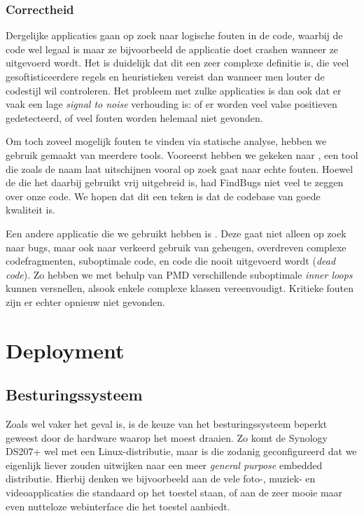 \subsection{Correctheid}
\label{server:realisatie:codeanalyse:correctheid}

Dergelijke applicaties gaan op zoek naar logische fouten in de code, waarbij de code wel legaal is maar ze bijvoorbeeld de applicatie doet crashen wanneer ze uitgevoerd wordt. Het is duidelijk dat dit een zeer complexe definitie is, die veel gesoftisticeerdere regels en heuristieken vereist dan wanneer men louter de codestijl wil controleren. Het probleem met zulke applicaties is dan ook dat er vaak een lage \emph{signal to noise} verhouding is: of er worden veel valse positieven gedetecteerd, of veel fouten worden helemaal niet gevonden.

Om toch zoveel mogelijk fouten te vinden via statische analyse, hebben we gebruik gemaakt van meerdere tools. Vooreerst hebben we gekeken naar , een tool die zoals de naam laat uitschijnen vooral op zoek gaat naar echte fouten. Hoewel de  die het daarbij gebruikt vrij uitgebreid is, had FindBugs niet veel te zeggen over onze code. We hopen dat dit een teken is dat de codebase van goede kwaliteit is.

Een andere applicatie die we gebruikt hebben is . Deze gaat niet alleen op zoek naar bugs, maar ook naar verkeerd gebruik van geheugen, overdreven complexe codefragmenten, suboptimale code, en code die nooit uitgevoerd wordt (\emph{dead code}). Zo hebben we met behulp van PMD verschillende suboptimale \emph{inner loops} kunnen versnellen, alsook enkele complexe klassen vereenvoudigt. Kritieke fouten zijn er echter opnieuw niet gevonden.

\chapter{Deployment}
\label{server:deployment}

\section{Besturingssysteem}
\label{server:deployment:besturingssysteem}

Zoals wel vaker het geval is, is de keuze van het besturingssysteem beperkt geweest door de hardware waarop het moest draaien. Zo komt de Synology DS207+ wel met een Linux-distributie, maar is die zodanig geconfigureerd dat we eigenlijk liever zouden uitwijken naar een meer \emph{general purpose} embedded distributie. Hierbij denken we bijvoorbeeld aan de vele foto-, muziek- en videoapplicaties die standaard op het toestel staan, of aan de zeer mooie maar even nutteloze webinterface die het toestel aanbiedt.

